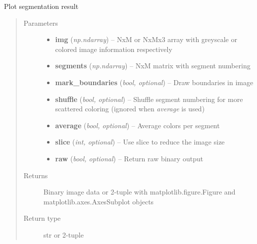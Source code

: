 \documentclass[letterpaper,10pt,english]{sphinxmanual}
\begin{document}
\begin{fulllineitems}
\label{flamingo/segmentation/index:flamingo.segmentation.plot.plot}
Plot segmentation result
\begin{quote}\begin{description}
\item[{Parameters}] \leavevmode\begin{itemize}
\item {} 
\textbf{img} (\emph{np.ndarray}) -- NxM or NxMx3 array with greyscale or colored image information
respectively

\item {} 
\textbf{segments} (\emph{np.ndarray}) -- NxM matrix with segment numbering

\item {} 
\textbf{mark\_boundaries} (\emph{bool, optional}) -- Draw boundaries in image

\item {} 
\textbf{shuffle} (\emph{bool, optional}) -- Shuffle segment numbering for more scattered coloring (ignored
when \emph{average} is used)

\item {} 
\textbf{average} (\emph{bool, optional}) -- Average colors per segment

\item {} 
\textbf{slice} (\emph{int, optional}) -- Use slice to reduce the image size

\item {} 
\textbf{raw} (\emph{bool, optional}) -- Return raw binary output

\end{itemize}

\item[{Returns}] \leavevmode
Binary image data or 2-tuple with matplotlib.figure.Figure and
matplotlib.axes.AxesSubplot objects

\item[{Return type}] \leavevmode
str or 2-tuple

\end{description}\end{quote}

\end{fulllineitems}

\end{document}

